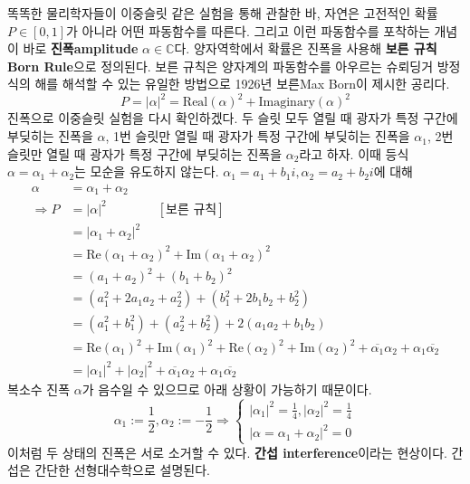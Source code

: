 \documentclass[a4paper,chapter,atbegshi]{oblivoir}
\begin{document}
똑똑한 물리학자들이 이중슬릿 같은 실험을 통해 관찰한 바, 자연은 고전적인 확률
$P\in[0,1]$가 아니라 어떤 파동함수를 따른다. 그리고 이런 파동함수를 포착하는 
개념이 바로 \textbf{진폭\tiny amplitude} $\alpha\in\mathbb{C}$다. 양자역학에서
확률은 진폭을 사용해 \textbf{보른 규칙\tiny Born Rule}으로 정의된다. 보른 규칙은
양자계의 파동함수를 아우르는 슈뢰딩거 방정식의 해를 해석할 수 있는 유일한
방법으로 1926년 보른{\tiny Max Born}이 제시한 공리다.
\begin{equation}\label{eq:11}
  P = |\alpha|^2 = \textrm{Real}(\alpha)^2+\textrm{Imaginary}(\alpha)^2
\end{equation}
진폭으로 이중슬릿 실험을 다시 확인하겠다. 두 슬릿 모두 열릴 때 광자가
특정 구간에 부딪히는 진폭을 $\alpha$, 1번 슬릿만 열릴 때 광자가 특정 구간에
부딪히는 진폭을 $\alpha_1$, 2번 슬릿만 열릴 때 광자가 특정 구간에
부딪히는 진폭을 $\alpha_2$라고 하자. 이때 등식 $\alpha=\alpha_1+\alpha_2$는 모순을
유도하지 않는다. $\alpha_1=a_1+b_1i, \alpha_2=a_2+b_2i$에 대해
\begin{align*}
  \alpha &= \alpha_1 + \alpha_2 \\
  \Rightarrow  P &= |\alpha|^2 \quad\quad\quad\quad[\textrm{보른 규칙}]\\ 
      &= |\alpha_1+\alpha_2|^2\\
      &= \textrm{Re}(\alpha_1+\alpha_2)^2+\textrm{Im}(\alpha_1+\alpha_2)^2\\
      &= (a_1+a_2)^2+(b_1+b_2)^2 \\
      &= (a_1^2+2a_1a_2+a_2^2)+(b_1^2+2b_1b_2+b_2^2) \\
      &= (a_1^2+b_1^2)+(a_2^2+b_2^2)+2(a_1a_2+b_1b_2)\\
      &= \textrm{Re}(\alpha_1)^2+\textrm{Im}(\alpha_1)^2+
      \textrm{Re}(\alpha_2)^2+\textrm{Im}(\alpha_2)^2+\overline{\alpha_1}\alpha_2+
      \alpha_1\overline{\alpha_2}\\
      &=|\alpha_1|^2+|\alpha_2|^2+\overline{\alpha_1}\alpha_2+
          \alpha_1\overline{\alpha_2} 
\end{align*}
복소수 진폭 $\alpha$가 음수일 수 있으므로 아래 상황이 가능하기 때문이다.
\[
  \alpha_1 := \frac{1}{2}, \alpha_2 := -\frac{1}{2} \Rightarrow
  \begin{cases}
    |\alpha_1|^2 = \frac{1}{4}, |\alpha_2|^2=\frac{1}{4} \\
              |\alpha=\alpha_1+\alpha_2|^2=0
  \end{cases}
\]
이처럼 두 상태의 진폭은 서로 소거할 수 있다. \textbf{간섭\tiny
interference}이라는 현상이다. 간섭은 간단한 선형대수학으로 설명된다.
\end{document}

